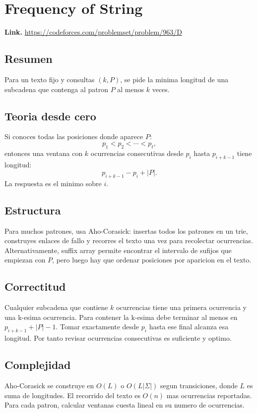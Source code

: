 \documentclass[10pt]{article}
\newcommand{\bigO}{O}
\begin{document}
\clearpage
\section{Frequency of String}
\textbf{Link.} \url{https://codeforces.com/problemset/problem/963/D}

\subsection*{Resumen}
Para un texto fijo y consultas $(k,P)$, se pide la minima longitud de una
subcadena que contenga al patron $P$ al menos $k$ veces.

\subsection*{Teoria desde cero}
Si conoces todas las posiciones donde aparece $P$:
\[
p_1<p_2<\cdots<p_t,
\]
entonces una ventana con $k$ ocurrencias consecutivas desde $p_i$ hasta
$p_{i+k-1}$ tiene longitud:
\[
p_{i+k-1}-p_i+|P|.
\]
La respuesta es el minimo sobre $i$.

\subsection*{Estructura}
Para muchos patrones, usa Aho-Corasick: insertas todos los patrones en un trie,
construyes enlaces de fallo y recorres el texto una vez para recolectar
ocurrencias. Alternativamente, suffix array permite encontrar el intervalo de
sufijos que empiezan con $P$, pero luego hay que ordenar posiciones por aparicion
en el texto.

\subsection*{Correctitud}
Cualquier subcadena que contiene $k$ ocurrencias tiene una primera ocurrencia y
una k-esima ocurrencia. Para contener la k-esima debe terminar al menos en
$p_{i+k-1}+|P|-1$. Tomar exactamente desde $p_i$ hasta ese final alcanza esa
longitud. Por tanto revisar ocurrencias consecutivas es suficiente y optimo.

\subsection*{Complejidad}
Aho-Corasick se construye en $\bigO(L)$ o $\bigO(L|\Sigma|)$ segun transiciones,
donde $L$ es suma de longitudes. El recorrido del texto es $\bigO(n)$ mas
ocurrencias reportadas. Para cada patron, calcular ventanas cuesta lineal en su
numero de ocurrencias.
\end{document}
